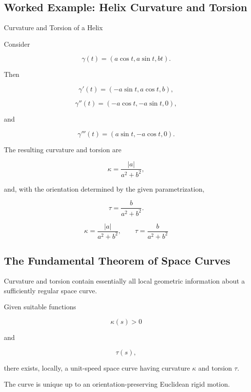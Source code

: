 \subsection{Worked Example: Helix Curvature and Torsion}
\label{subsec:worked-helix-curvature-torsion}

\begin{workedexamplebox}{Curvature and Torsion of a Helix}

Consider

\[
\gamma(t)
=
(a\cos t,a\sin t,bt).
\]

Then

\[
\gamma'(t)
=
(-a\sin t,a\cos t,b),
\]

\[
\gamma''(t)
=
(-a\cos t,-a\sin t,0),
\]

and

\[
\gamma'''(t)
=
(a\sin t,-a\cos t,0).
\]

The resulting curvature and torsion are

\[
\kappa
=
\frac{|a|}
{a^2+b^2},
\]

and, with the orientation determined by the given parametrization,

\[
\tau
=
\frac{b}
{a^2+b^2}.
\]

\begin{answerbox}
\[
\boxed{
\kappa=\frac{|a|}{a^2+b^2},
\qquad
\tau=\frac{b}{a^2+b^2}
}
\]
\end{answerbox}
\end{workedexamplebox}

\subsection{The Fundamental Theorem of Space Curves}
\label{subsec:fundamental-theorem-space-curves}

Curvature and torsion contain essentially all local geometric information
about a sufficiently regular space curve.

\begin{theorem}
Given suitable functions

\[
\kappa(s)>0
\]

and

\[
\tau(s),
\]

there exists, locally, a unit-speed space curve having curvature
\(\kappa\) and torsion \(\tau\).

The curve is unique up to an orientation-preserving Euclidean rigid motion.
\end{theorem}

